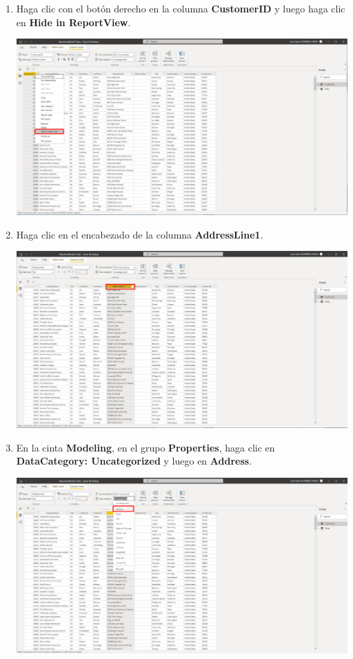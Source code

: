 \documentclass[12pt,letterpaper]{article}
\newcommand\tab[1][1cm]{\hspace*{#1}}
\begin{document}
\begin{enumerate}[\tab 1.]
\begin{center}
        \end{center}
        \item Haga clic con el botón derecho en la columna \textbf{CustomerID} y luego haga clic en \textbf{Hide in ReportView}.
        \begin{center}
            \includegraphics[width=13cm]{./img/img23.png}
        \end{center}
        \item Haga clic en el encabezado de la columna \textbf{AddressLine1}.
        \begin{center}
            \includegraphics[width=13cm]{./img/img24.png}
        \end{center}
        \item En la cinta \textbf{Modeling}, en el grupo \textbf{Properties}, haga clic en \textbf{DataCategory: Uncategorized} y luego en \textbf{Address}.
        \begin{center}
            \includegraphics[width=13cm]{./img/img25.png}

\end{center}
\end{enumerate}
\end{document}
